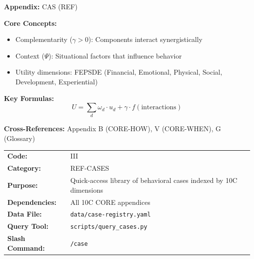 \begin{tcolorbox}[colback=blue!5!white, colframe=blue!75!black,
    title=Quick Reference: Case Registry: 10C-Indexed Example Library]

\textbf{Appendix:} CAS (REF)

\textbf{Core Concepts:}
\begin{itemize}[nosep]
\item Complementarity ($\gamma > 0$): Components interact synergistically
\item Context ($\Psi$): Situational factors that influence behavior
\item Utility dimensions: FEPSDE (Financial, Emotional, Physical, Social, Development, Experiential)
\end{itemize}

\textbf{Key Formulas:}
\begin{equation}
U = \sum_d \omega_d \cdot u_d + \gamma \cdot f(\text{interactions})
\end{equation}

\textbf{Cross-References:} Appendix B (CORE-HOW), V (CORE-WHEN), G (Glossary)
\end{tcolorbox}





\begin{tcolorbox}[colback=gray!5, colframe=gray!50, title=Appendix Metadata]
\begin{tabular}{ll}
\textbf{Code:} & III \\
\textbf{Category:} & REF-CASES \\
\textbf{Purpose:} & Quick-access library of behavioral cases indexed by 10C dimensions \\
\textbf{Dependencies:} & All 10C CORE appendices \\
\textbf{Data File:} & \texttt{data/case-registry.yaml} \\
\textbf{Query Tool:} & \texttt{scripts/query\_cases.py} \\
\textbf{Slash Command:} & \texttt{/case} \\
\end{tabular}
\end{tcolorbox}


